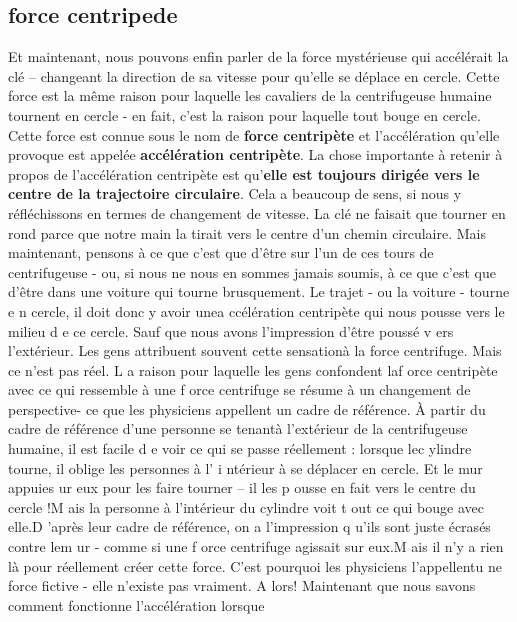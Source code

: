 \hypertarget{force-centripede}{%
\subsection{force centripede}\label{force-centripede}}

Et maintenant, nous pouvons enfin parler de la force mystérieuse qui
accélérait la clé -- changeant la direction de sa vitesse pour qu'elle
se déplace en cercle. Cette force est la même raison pour laquelle les
cavaliers de la centrifugeuse humaine tournent en cercle - en fait,
c'est la raison pour laquelle tout bouge en cercle. Cette force est
connue sous le nom de \textbf{force centripète} et l'accélération
qu'elle provoque est appelée \textbf{accélération centripète}. La chose
importante à retenir à propos de l'accélération centripète est
qu'\textbf{elle est toujours dirigée vers le centre de la trajectoire
circulaire}. Cela a beaucoup de sens, si nous y réfléchissons en termes
de changement de vitesse. La clé ne faisait que tourner en rond parce
que notre main la tirait vers le centre d'un chemin circulaire. Mais
maintenant, pensons à ce que c'est que d'être sur l'un de ces tours de
centrifugeuse - ou, si nous ne nous en sommes jamais soumis, à ce que
c'est que d'être dans une voiture qui tourne brusquement. Le trajet - ou
la voiture - tourne e n cercle, il doit donc y avoir unea ccélération
centripète qui nous pousse vers le milieu d e ce cercle. Sauf que nous
avons l'impression d'être poussé v ers l'extérieur. Les gens attribuent
souvent cette sensationà la force centrifuge. Mais ce n'est pas réel. L
a raison pour laquelle les gens confondent laf orce centripète avec ce
qui ressemble à une f orce centrifuge se résume à un changement de
perspective- ce que les physiciens appellent un cadre de référence. À
partir du cadre de référence d'une personne se tenantà l'extérieur de la
centrifugeuse humaine, il est facile d e voir ce qui se passe réellement
: lorsque lec ylindre tourne, il oblige les personnes à l' i ntérieur à
se déplacer en cercle. Et le mur appuies ur eux pour les faire tourner
-- il les p ousse en fait vers le centre du cercle !M ais la personne à
l'intérieur du cylindre voit t out ce qui bouge avec elle.D 'après leur
cadre de référence, on a l'impression q u'ils sont juste écrasés contre
lem ur - comme si une f orce centrifuge agissait sur eux.M ais il n'y a
rien là pour réellement créer cette force. C'est pourquoi les physiciens
l'appellentu ne force fictive - elle n'existe pas vraiment. A lors!
Maintenant que nous savons comment fonctionne l'accélération lorsque
